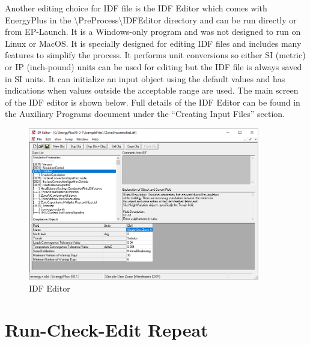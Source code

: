 Another editing choice for IDF file is the IDF Editor which comes
with EnergyPlus in the \textbackslash PreProcess\textbackslash IDFEditor
directory and can be run directly or from EP-Launch. It is a Windows-only
program and was not designed to run on Linux or MacOS. It is specially
designed for editing IDF files and includes many features to simplify
the process. It performs unit conversions so either SI (metric) or
IP (inch-pound) units can be used for editing but the IDF file is
always saved in SI units. It can initialize an input object using
the default values and has indications when values outside the acceptable
range are used. The main screen of the IDF editor is shown below.
Full details of the IDF Editor can be found in the Auxiliary Programs
document under the ``Creating Input Files'' section.

\begin{figure}[hbtp]
\centering
\includegraphics[width=0.9\textwidth, height=0.9\textheight, keepaspectratio=true]{media/idfeditor.png}
\caption{IDF Editor}
\end{figure}

\section{Run-Check-Edit Repeat \label{subsec:Run-Check-Edit-Repeat}}

